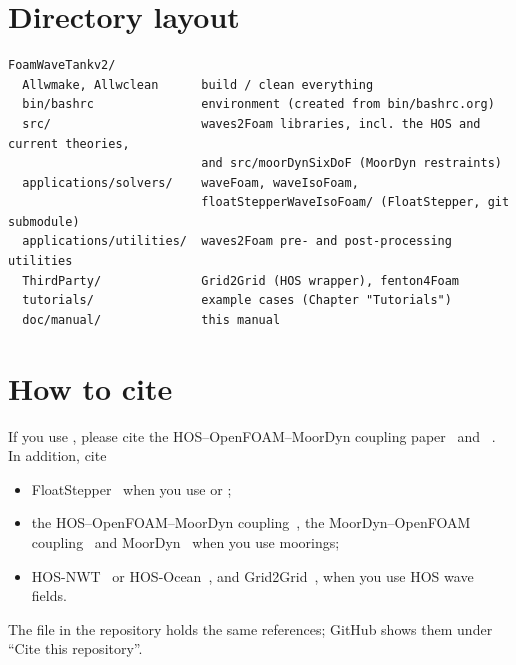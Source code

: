 \section{Directory layout}
\begin{lstlisting}[style=shell,caption={Top level of the repository.}]
FoamWaveTankv2/
  Allwmake, Allwclean      build / clean everything
  bin/bashrc               environment (created from bin/bashrc.org)
  src/                     waves2Foam libraries, incl. the HOS and current theories,
                           and src/moorDynSixDoF (MoorDyn restraints)
  applications/solvers/    waveFoam, waveIsoFoam,
                           floatStepperWaveIsoFoam/ (FloatStepper, git submodule)
  applications/utilities/  waves2Foam pre- and post-processing utilities
  ThirdParty/              Grid2Grid (HOS wrapper), fenton4Foam
  tutorials/               example cases (Chapter "Tutorials")
  doc/manual/              this manual
\end{lstlisting}

\section{How to cite}
\label{sec:cite}
If you use \fwt{}, please cite the HOS--OpenFOAM--MoorDyn coupling
paper~\cite{aliyar2022numerical} and \wtwof{}~\cite{jacobsen2012wave}. In addition, cite
\begin{itemize}
  \item FloatStepper~\cite{roenby2024robust} when you use  or
        ;
  \item the HOS--OpenFOAM--MoorDyn coupling~\cite{aliyar2022numerical}, the MoorDyn--OpenFOAM
        coupling~\cite{chen2022cfd} and MoorDyn~\cite{hall2015validation} when
        you use moorings;
  \item HOS-NWT~\cite{ducrozet2012modified} or HOS-Ocean~\cite{ducrozet2016hosocean}, and
        Grid2Grid~\cite{choi2019grid2grid}, when you use HOS wave fields.
\end{itemize}
The file  in the repository holds the same references; GitHub shows them
under ``Cite this repository''.

